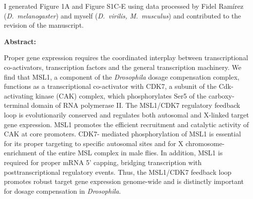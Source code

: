 I generated Figure 1A and Figure S1C-E using data processed by Fidel Ramírez (\textit{D.~melanogaster}) and myself (\textit{D.~virilis, M.~musculus}) and contributed to the revision of the manuscript.

\textbf{Abstract:}

Proper gene expression requires the coordinated interplay between transcriptional co-activators, transcription factors and the general transcription machinery. We find that MSL1, a component of the \textit{Drosophila} dosage compensation complex, functions as a transcriptional co-activator with CDK7, a subunit of the Cdk-activating kinase (CAK) complex, which phosphorylates Ser5 of the carboxy-terminal domain of RNA polymerase II. The MSL1/CDK7 regulatory feedback loop is evolutionarily conserved and regulates both autosomal and X-linked target gene expression. MSL1 promotes the efficient recruitment and catalytic activity of CAK at core promoters. CDK7-
mediated phosphorylation of MSL1 is essential for its proper targeting to specific autosomal sites and for X chromosome-enrichment of the entire MSL complex in male flies. In addition, MSL1 is required for proper mRNA 5’ capping, bridging transcription with posttranscriptional regulatory events. Thus, the MSL1/CDK7 feedback loop promotes robust target gene expression genome-wide and is distinctly important for dosage compensation in \textit{Drosophila}.
